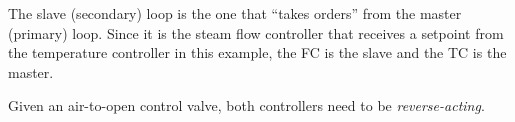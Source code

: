 The slave (secondary) loop is the one that ``takes orders'' from the master (primary) loop.  Since it is the steam flow controller that receives a setpoint from the temperature controller in this example, the FC is the slave and the TC is the master.

\vskip 10pt

Given an air-to-open control valve, both controllers need to be {\it reverse-acting}.




